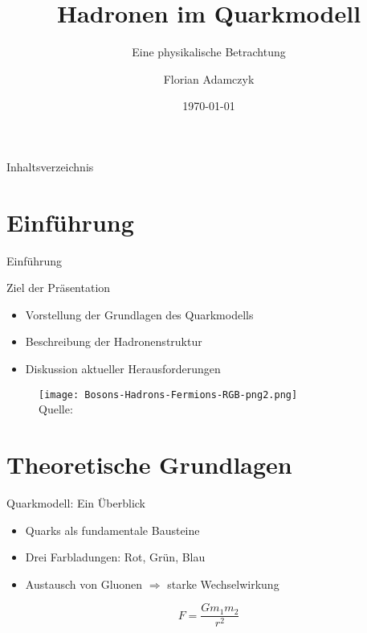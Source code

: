 \documentclass[aspectratio=169]{beamer} %
\title{Hadronen im Quarkmodell}
\subtitle{Eine physikalische Betrachtung}
\author{Florian Adamczyk}
\date{\today}
\newcommand{\figciteweb}[1]{\\[-3mm]{\scriptsize Quelle: \citeauthortitle{#1}}}
\begin{document}
    
    \begin{frame}\titlepage\end{frame}
    
    \begin{frame}{Inhaltsverzeichnis}
        \tableofcontents
    \end{frame}
    
    \section{Einführung}
    \begin{frame}{Einführung}
        \begin{block}{Ziel der Präsentation}
            \begin{itemize}
                \item Vorstellung der Grundlagen des Quarkmodells
                \item Beschreibung der Hadronenstruktur
                \item Diskussion aktueller Herausforderungen
            \end{itemize}
        \end{block}
        \begin{figure}
            \centering
            \texttt{[image: Bosons-Hadrons-Fermions-RGB-png2.png]}
            \figciteweb{Wikipedia.Standardmodell}
        \end{figure}
    \end{frame}
    
    \section{Theoretische Grundlagen}
    \begin{frame}{Quarkmodell: Ein Überblick}
        \begin{itemize}
            \item Quarks als fundamentale Bausteine
            \item Drei Farbladungen: Rot, Grün, Blau
            \item Austausch von Gluonen $\Rightarrow$ starke Wechselwirkung
        \end{itemize}
        \begin{equation*}
            F = \frac{Gm_1m_2}{r^2} %
        \end{equation*}
    \end{frame}
    
\end{document}
